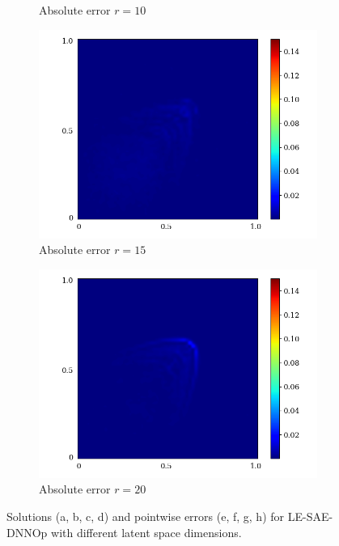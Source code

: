 \begin{figure}[!htb]
\begin{center}
\begin{subfigure}[b]{0.23\textwidth}
\begin{center}
            \end{center}
            \caption{Absolute error $r = 10$}
        \end{subfigure}   
        \begin{subfigure}[b]{0.23\textwidth}
            \begin{center}
                \includegraphics[trim = {0, 0, 3cm, 0}, clip, width=\textwidth]{Pictures/X-rom-LE-SAE-15-abs-err.png}
            \end{center}
            \caption{Absolute error $r = 15$}
        \end{subfigure}    
        \begin{subfigure}[b]{0.23\textwidth}
            \begin{center}
                \includegraphics[trim = {0, 0, 3cm, 0}, clip, width=\textwidth]{Pictures/X-rom-LE-SAE-20-abs-err.png}
            \end{center}
            \caption{Absolute error $r = 20$}
        \end{subfigure}
     \end{center}
     \caption[Solutions and pointwise errors for LE-SAE-DNNOp.]{Solutions (a, b, c, d) and pointwise errors (e, f, g, h) for LE-SAE-DNNOp with different latent space dimensions.}
        \label{fig: lesae-burger}
\end{figure}


